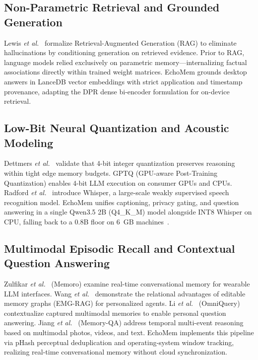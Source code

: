 \documentclass[conference]{IEEEtran}
\begin{document}
\subsection{Non-Parametric Retrieval and Grounded Generation}

Lewis \textit{et al.}~\cite{lewis2020rag} formalize Retrieval-Augmented
Generation (RAG) to eliminate hallucinations by conditioning generation on
retrieved evidence. Prior to RAG, language models relied exclusively on
parametric memory---internalizing factual associations directly within trained
weight matrices. EchoMem grounds desktop answers in LanceDB vector embeddings
with strict application and timestamp provenance, adapting the DPR dense
bi-encoder formulation for on-device retrieval.

\subsection{Low-Bit Neural Quantization and Acoustic Modeling}

Dettmers \textit{et al.}~\cite{dettmers2023gptq} validate that 4-bit integer
quantization preserves reasoning within tight edge memory budgets. GPTQ
(GPU-aware Post-Training Quantization) enables 4-bit LLM execution on consumer
GPUs and CPUs. Radford \textit{et al.}~\cite{radford2023whisper} introduce
Whisper, a large-scale weakly supervised speech recognition model. EchoMem
unifies captioning, privacy gating, and question answering in a single
Qwen3.5 2B (Q4\_K\_M) model alongside INT8 Whisper on CPU, falling back to a
0.8B floor on 6~GB machines~\cite{dettmers2023gptq}.

\subsection{Multimodal Episodic Recall and Contextual Question Answering}

Zulfikar \textit{et al.}~\cite{zulfikar2024memoro} (Memoro) examine real-time
conversational memory for wearable LLM interfaces. Wang \textit{et
al.}~\cite{wang2024emgrag} demonstrate the relational advantages of editable
memory graphs (EMG-RAG) for personalized agents. Li \textit{et
al.}~\cite{li2025omniquery} (OmniQuery) contextualize captured multimodal
memories to enable personal question answering. Jiang \textit{et
al.}~\cite{jiang2025memoryqa} (Memory-QA) address temporal multi-event reasoning
based on multimodal photos, videos, and text. EchoMem implements this pipeline
via pHash perceptual deduplication and operating-system window tracking,
realizing real-time conversational memory without cloud synchronization.
\end{document}
